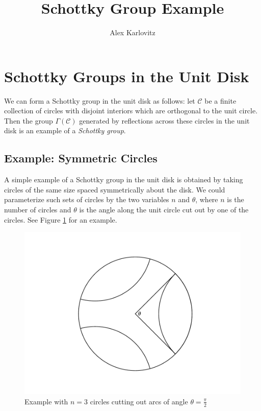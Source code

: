 \documentclass[]{article}
\title{Schottky Group Example}
\author{Alex Karlovitz}
\date{}
\begin{document}
	
	\maketitle
	
\section*{Schottky Groups in the Unit Disk}

We can form a Schottky group in the unit disk as follows:
let $\mathcal{C}$ be a finite collection of circles with disjoint interiors which are orthogonal to the unit circle.
Then the group $\Gamma(\mathcal{C})$ generated by reflections across these circles in the unit disk is an example of a \textit{Schottky group}.

\subsection*{Example: Symmetric Circles}

A simple example of a Schottky group in the unit disk is obtained by taking circles of the same size spaced symmetrically about the disk.
We could parameterize such sets of circles by the two variables $n$ and $\theta$, where $n$ is the number of circles and $\theta$ is the angle along the unit circle cut out by one of the circles.
See Figure \ref{pi_over_2} for an example.

\begin{figure}[h]
	\centering
	\includegraphics[trim=110 40 100 50, clip, width=0.6\linewidth]{pi_over_2.pdf}
	\caption{Example with $n = 3$ circles cutting out arcs of angle $\theta = \frac{\pi}{2}$}
	\label{pi_over_2}
\end{figure}
\end{document}
